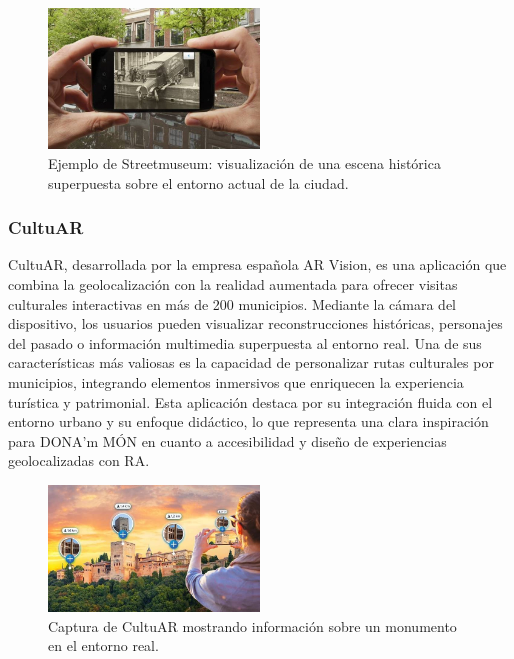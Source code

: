 \begin{figure}[H]
    \centering
    \includegraphics[width=0.5\textwidth]{figs/streetmuseum.png}
    \caption{Ejemplo de Streetmuseum: visualización de una escena histórica superpuesta sobre el entorno actual de la ciudad.}
    \label{fig:streetmuseum}
\end{figure}

\subsubsection{CultuAR}

CultuAR, desarrollada por la empresa española AR Vision, es una aplicación que combina la geolocalización con la realidad aumentada para ofrecer visitas culturales interactivas en más de 200 municipios. Mediante la cámara del dispositivo, los usuarios pueden visualizar reconstrucciones históricas, personajes del pasado o información multimedia superpuesta al entorno real. Una de sus características más valiosas es la capacidad de personalizar rutas culturales por municipios, integrando elementos inmersivos que enriquecen la experiencia turística y patrimonial. Esta aplicación destaca por su integración fluida con el entorno urbano y su enfoque didáctico, lo que representa una clara inspiración para DONA'm MÓN en cuanto a accesibilidad y diseño de experiencias geolocalizadas con RA.

\begin{figure}[H]
    \centering
    \includegraphics[width=0.5\textwidth]{figs/cultuar.jpeg}
    \caption{Captura de CultuAR mostrando información sobre un monumento en el entorno real.}
    \label{fig:cultuar}
\end{figure}

